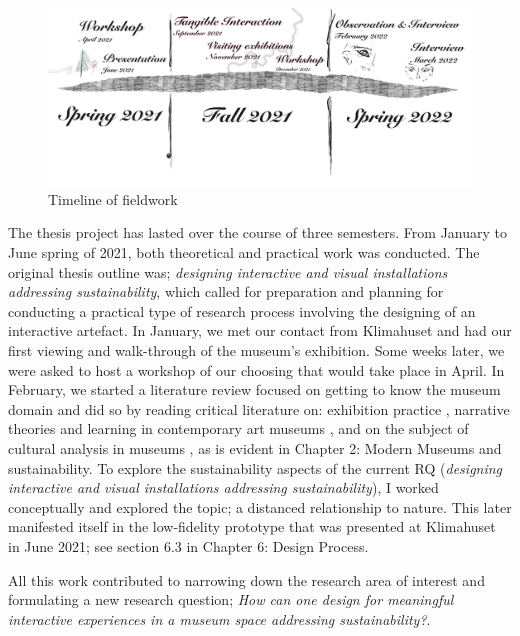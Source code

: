 \begin{figure}[H]
\includegraphics[width=14cm]{pictures/methodology/timeline.jpg}
\caption{Timeline of fieldwork}
\centering 
\end{figure}

The thesis project has lasted over the course of three semesters. From January to June spring of 2021, both theoretical and practical work was conducted. The original thesis outline was; \emph{designing interactive and visual installations addressing sustainability}, which called for preparation and planning for conducting a practical type of research process involving the designing of an interactive artefact. In January, we met our contact from Klimahuset and had our first viewing and walk-through of the museum's exhibition. Some weeks later, we were asked to host a workshop of our choosing that would take place in April. In February, we started a literature review focused on getting to know the museum domain and did so by reading critical literature on: exhibition practice \autocite{Thi_book}, narrative theories and learning in contemporary art museums \autocite{narrative_sitzia}, and on the subject of cultural analysis in museums \autocite{Miekebal_book}, as is evident in Chapter 2: Modern Museums and sustainability. To explore the sustainability aspects of the current RQ (\emph{designing interactive and visual installations addressing sustainability}), I worked conceptually and explored the topic; a distanced relationship to nature. This later manifested itself in the low-fidelity prototype that was presented at Klimahuset in June 2021; see section 6.3 in Chapter 6: Design Process.

All this work contributed to narrowing down the research area of interest and formulating a new research question; \textit{How can one design for meaningful interactive experiences in a museum space addressing sustainability?}.

